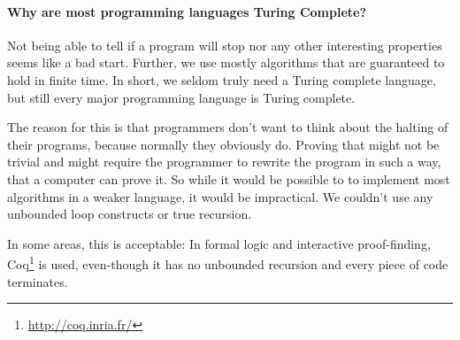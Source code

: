 \paragraph{Why are most programming languages Turing Complete?} %
\label{sub:Why are most programming languages Turing Complete?}
Not being able to tell if a program will stop nor any other interesting 
properties seems like a bad start. Further, we use mostly algorithms that are
guaranteed to hold in finite time. In short, we seldom truly need a Turing 
complete language, but still every major programming language is Turing 
complete. 

The reason for this is that programmers don't want to think about the halting 
of their programs, because normally they obviously do. Proving that might not 
be trivial and might require the programmer to rewrite the program in such a 
way, that a computer can prove it. So while it would be possible to to 
implement most algorithms in a weaker language, it would be impractical. We
couldn't use any unbounded loop constructs or true recursion.

In some areas, this is acceptable: In formal logic and interactive 
proof-finding, Coq\footnote{\url{http://coq.inria.fr/}} is used, even-though it has 
no unbounded recursion and every piece of code terminates.
